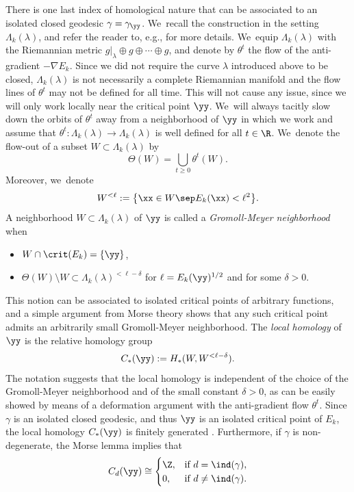 There is one last index of homological nature that can be associated to an isolated closed geodesic $\gamma=\gamma_{\yy}$. We~recall the construction in the setting $\Lambda_k(\lambda)$, and refer the reader to, e.g., \cite{Rademacher:1992aa,Bangert:2010aa,Asselle:2018aa} for more details. We~equip $\Lambda_k(\lambda)$ with the Riemannian metric $g|_\lambda\oplus g\oplus\cdots\oplus g$, and denote by $\theta^t$ the flow of the anti-gradient $-\nabla E_k$.
Since we did not require the curve $\lambda$ introduced above to be closed, $\Lambda_k(\lambda)$ is not necessarily a complete Riemannian manifold and the flow lines of $\theta^t$ may not be defined for all time. This will not cause any issue, since we will only work locally near the critical point $\yy$. We~will always tacitly slow down the orbits of $\theta^t$ away from a neighborhood of $\yy$ in which we work and assume that $\theta^t:\Lambda_k(\lambda)\to\Lambda_k(\lambda)$ is well defined for all $t\in\R$. We~denote the flow-out of a subset $W\subset\Lambda_k(\lambda)$ by
\[
\Theta(W)=\bigcup_{t\geq0} \theta^t(W).
\]
Moreover, we~denote \[
W^{<\ell}:=\big\{\xx\in W\sep E_k(\xx)<\ell^2\big\}.
\]
A neighborhood $W\subset \Lambda_k(\lambda)$ of $\yy$ is called a \emph{Gromoll-Meyer neighborhood} when
\begin{itemize}
\item $W\cap\crit(E_k)=\{\yy\}$,
\item $\Theta(W)\setminus W\subset \Lambda_k(\lambda)^{<\ell-\delta}$ for $\ell=E_k(\yy)^{1/2}$ and for some $\delta>0$.
\end{itemize}
This notion can be associated to isolated critical points of arbitrary functions, and a simple argument from Morse theory shows that any such critical point admits an arbitrarily small Gromoll-Meyer neighborhood.
The \emph{local homology} of $\yy$ is the relative homology group
\begin{align*}
C_*(\yy):=H_*(W,W^{<\ell-\delta}).
\end{align*}
The notation suggests that the local homology is independent of the choice of the Gromoll-Meyer neighborhood and of the small constant $\delta>0$, as can be easily showed by means of a deformation argument with the anti-gradient flow $\theta^t$.
Since $\gamma$ is an isolated closed geodesic, and thus $\yy$ is an isolated critical point of $E_k$, the local homology $C_*(\yy)$ is finitely generated \cite[p.\,364]{Gromoll:1969aa}. Furthermore, if $\gamma$ is non-degenerate, the Morse lemma \cite[Lem.\,2.2]{Milnor:1963aa} implies that
\begin{align}
\label{e:loc_hom_1}
C_d(\yy)
\cong
\begin{cases}
\Z, & \text{if } d=\ind(\gamma),\\
0, & \text{if } d\neq\ind(\gamma).
\end{cases}
\end{align}

